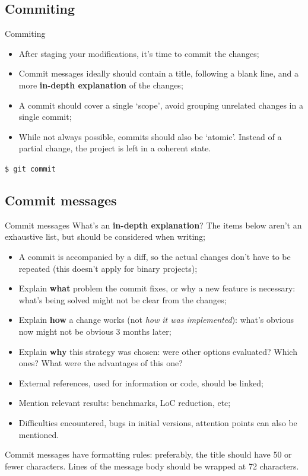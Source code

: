 \documentclass{beamer}
\begin{document}
\subsection{Commiting}
\begin{frame}{Commiting}
  \begin{itemize}
    \item After staging your modifications, it's time to commit the changes;
    \item Commit messages ideally should contain a title, following a blank line, and a more \textbf{in-depth explanation} of the changes;
    \item A commit should cover a single `scope', avoid grouping unrelated changes in a single commit;
    \item While not always possible, commits should also be `atomic'. Instead of a partial change, the project is left in a coherent state.
  \end{itemize}
  \begin{block}{}
    \texttt{\$ git commit}
  \end{block}
  \begin{scriptsize}
    
  \end{scriptsize}
\end{frame}

\subsection{Commit messages}
\begin{frame}{Commit messages}
  What's an \textbf{in-depth explanation}? The items below aren't an exhaustive list, but should be considered when writing;
  \begin{itemize}
    \item A commit is accompanied by a diff, so the actual changes don't have to be repeated (this doesn't apply for binary projects);
    \item Explain \textbf{what} problem the commit fixes, or why a new feature is necessary: what's being solved might not be clear from the changes;
    \item Explain \textbf{how} a change works (not \textit{how it was implemented}): what's obvious now might not be obvious 3 months later;
    \item Explain \textbf{why} this strategy was chosen: were other options evaluated? Which ones? What were the advantages of this one?
    \item External references, used for information or code, should be linked;
    \item Mention relevant results: benchmarks, LoC reduction, etc;
    \item Difficulties encountered, bugs in initial versions, attention points can also be mentioned.
  \end{itemize}
  \begin{block}{}
    Commit messages have formatting rules: preferably, the title should have 50 or fewer characters. Lines of the message body should be wrapped at 72 characters.
  \end{block}
\end{frame}
\end{document}
